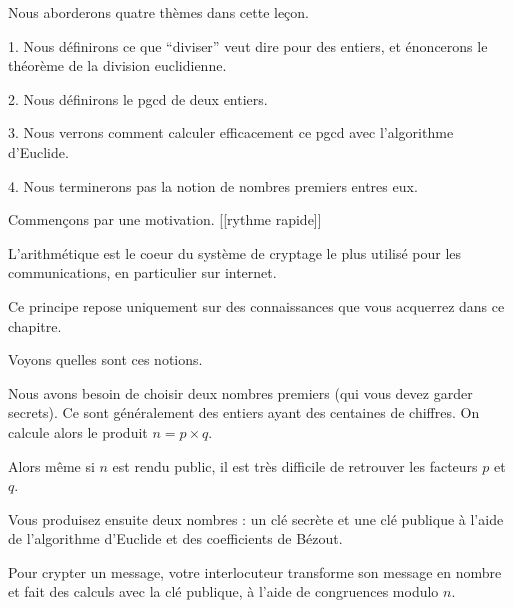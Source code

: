 





\debuttexte

\diapo

\change

 Nous aborderons quatre thèmes dans cette leçon.

\change

 1. Nous définirons ce que ``diviser'' veut dire pour des entiers, 
et énoncerons le théorème de la division euclidienne.

\change

 2. Nous définirons le pgcd de deux entiers.

\change

 3. Nous verrons comment calculer efficacement ce pgcd avec l'algorithme d'Euclide.

\change 

 4. Nous terminerons pas la notion de nombres premiers entres eux.


\diapo

Commençons par une motivation. [[rythme rapide]]

L'arithmétique est le coeur du système de cryptage le plus utilisé pour
les communications, en particulier sur internet.

Ce principe repose uniquement sur des connaissances que vous acquerrez dans ce chapitre.

Voyons quelles sont ces notions.

\change

Nous avons besoin de choisir deux nombres premiers (qui vous devez garder secrets).
Ce sont généralement des entiers ayant des centaines de chiffres. 
On calcule alors le produit $n=p\times q$. 

\change

Alors même si $n$ est rendu public, il est très difficile de retrouver les facteurs $p$ et $q$.


\change

Vous produisez ensuite deux nombres : un clé secrète et une clé publique à l'aide de l'algorithme d'Euclide et des
coefficients de Bézout.

\change

Pour crypter un message, votre interlocuteur transforme son message en nombre et fait des calculs 
avec la clé publique, à l'aide de congruences modulo $n$.

